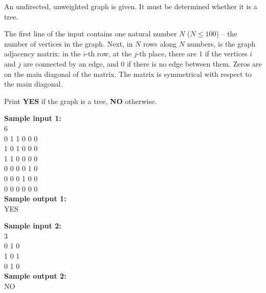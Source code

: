\documentclass[a4paper]{article}
\begin{document}
An undirected, unweighted graph is given. It must be determined whether it is a tree.

The first line of the input contains one natural number $N$ ($N \le 100$) -- the number of vertices in the graph. Next, in $N$ rows along $N$ numbers, is the graph adjacency matrix: in the $i$-th row, at the $j$-th place, there are $1$ if the vertices $i$ and $j$ are connected by an edge, and $0$ if there is no edge between them. Zeros are on the main diagonal of the matrix. The matrix is symmetrical with respect to the main diagonal.

Print \textbf{YES} if the graph is a tree, \textbf{NO} otherwise.

\SPACE

\noindent \textbf{Sample input 1:}\\
6\\
0 1 1 0 0 0\\
1 0 1 0 0 0\\
1 1 0 0 0 0\\
0 0 0 0 1 0\\
0 0 0 1 0 0\\
0 0 0 0 0 0\\


\noindent \textbf{Sample output 1:}\\
YES

\SPACE

\noindent \textbf{Sample input 2:}\\
3\\
0 1 0\\
1 0 1\\
0 1 0\\


\noindent \textbf{Sample output 2:}\\
NO
\end{document}
